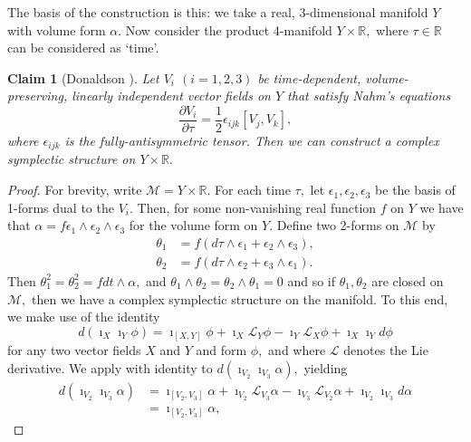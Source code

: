 \documentclass[a4paper,onecolumn,12pt]{article}
\newtheorem{claim}[thm]{Claim}
\theoremstyle{definition}
\theoremstyle{remark}
\newcommand{\al}{\alpha}
\newcommand{\e}{\epsilon}
\newcommand{\ddt}[1]{\frac{\partial #1}{\partial \tau}}
\newcommand{\R}{\mathbb{R}}
\begin{document}
The basis of the construction is this: we take a real, 3-dimensional manifold $Y$ with volume form $\al.$ Now consider the product 4-manifold $Y\times\R,$ where $\tau\in\R$ can be considered as `time'.\\

\begin{claim}[Donaldson \cite{donaldson}]
	Let $V_{i}$ $(i=1,2,3)$ be time-dependent, volume-preserving, linearly independent vector fields on $Y$ that satisfy Nahm's equations
	$$\ddt{V_{i}} = \frac{1}{2}\e_{ijk}[V_{j},V_{k}],
	$$
	where $\e_{ijk}$ is the fully-antisymmetric tensor. Then we can construct a complex symplectic structure on $Y\times\R.$
\end{claim}
\begin{proof}
	For brevity, write $\mathcal{M} = Y\times\R.$ For each time $\tau,$ let $\e_{1},\e_{2},\e_{3}$ be the basis of 1-forms dual to the $V_{i}.$ Then, for some non-vanishing real function $f$ on $Y$ we have that $\alpha=f\e_{1}\wedge\e_{2}\wedge\e_{3}$
	for the volume form on $Y.$ Define two 2-forms on $\mathcal{M}$ by
	\begin{subequations}
		\begin{align}
		\theta_{1} &= f(d\tau \wedge \e_{1} +  \e_{2}\wedge \e_{3}),\\
		\theta_{2} &= f(d\tau \wedge \e_{2} +  \e_{3}\wedge \e_{1}).
		\end{align}
	\end{subequations}
	Then $\theta^{2}_{1}=\theta^{2}_{2}=f dt\wedge\alpha,$ and $\theta_{1}\wedge\theta_{2}=\theta_{2}\wedge\theta_{1}=0$ and so if $\theta_{1}, \theta_{2}$ are closed on $\mathcal{M},$ then we have a complex symplectic structure on the manifold. To this end, we make use of the identity
	\begin{equation}
	\label{cartan}
	d(\imath_{X}\imath_{Y}\phi) = \imath_{[X,Y]}\phi + \imath_{X}\mathcal{L}_{Y}\phi - \imath_{Y}\mathcal{L}_{X}\phi + \imath_{X}\imath_{Y}d\phi
	\end{equation}
	for any two vector fields $X$ and $Y$ and form $\phi,$ and where $\mathcal{L}$ denotes the Lie derivative. We apply with identity to $d(\imath_{V_{2}}\imath_{V_{3}}\alpha),$ yielding
	\begin{align*}
	d(\imath_{V_{2}}\imath_{V_{3}}\alpha) &= \imath_{[V_{2},V_{3}]}\alpha + \imath_{V_{2}}\mathcal{L}_{V_{3}}\alpha - \imath_{V_{3}}\mathcal{L}_{V_{2}}\alpha + \imath_{V_{2}}\imath_{V_{3}}d\alpha\\
	&= \imath_{[V_{2},V_{3}]}\alpha,
	\end{align*}

\end{proof}
\end{document}
